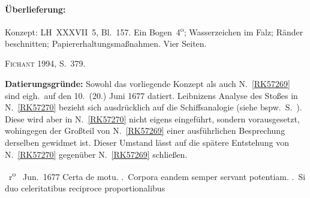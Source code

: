 %  
%				
%
%
\frenchspacing
%
\begin{ledgroupsized}[r]{120mm}
\footnotesize
\pstart
\noindent\textbf{Überlieferung:}
\pend
\end{ledgroupsized}
%
\begin{ledgroupsized}[r]{114mm}
\footnotesize
\pstart \parindent -6mm
%
Konzept:
LH~XXXVII~5, Bl.~157. 
Ein Bogen~4\textsuperscript{o}; Wasserzeichen im Falz; Ränder beschnitten; Papiererhaltungsmaßnahmen.
Vier Seiten.
\pend
\end{ledgroupsized}
%
\begin{ledgroupsized}[r]{114mm}
\footnotesize
\pstart
\parindent -6mm
%
\textsc{Fichant} 1994, S.~379\cite{01056}.\pend%
\end{ledgroupsized}
%
%
\vspace{5mm}
\begin{ledgroup}
\footnotesize
\pstart
\noindent%
\textbf{Datierungsgründe:}	
Sowohl das vorliegende Konzept als auch N.~\ref{RK57269} sind eigh.\ auf den 10.\ (20.) Juni 1677 datiert.
%
Leibnizens Analyse des Stoßes in N.~\ref{RK57270} bezieht sich ausdrücklich auf die Schiffsanalogie
%
(siehe bspw.\ S.~).
%
Diese wird aber in N.~\ref{RK57270} nicht eigens eingeführt, sondern vorausgesetzt,
%
wohingegen der Großteil von N.~\ref{RK57269} einer ausführlichen Besprechung derselben gewidmet ist.
%
Dieser Umstand lässt auf die spätere Entstehung von N.~\ref{RK57270} gegenüber N.~\ref{RK57269} schließen.
%
\pend 
\end{ledgroup}
%
%
\frenchspacing
\vspace{8mm}
\pstart%
\normalsize%
\noindent%
~r\textsuperscript{o}\rbrack\
\pend
\count{}%
\count{}%
\count{}
%
\pstart
{} Jun.\ 1677
\pend 
%
\pstart
\centering
Certa de motu.%
\protect{}
\pend
\vspace{0.5em}
.\ Corpora eandem semper servant potentiam\protect{}. 
\pend {}.\ Si duo  celeritatibus reciproce proportionalibus%
